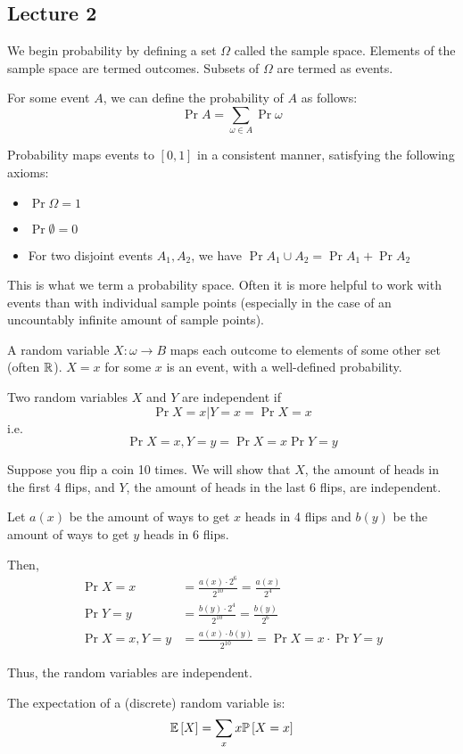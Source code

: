 \subsection{Lecture 2}

We begin probability by defining a set $\Omega$ called the sample space.
Elements of the sample space are termed outcomes. Subsets of $\Omega$ are termed as events.

For some event $A$, we can define the probability of $A$ as follows:
\[ \Pr{A} = \sum_{\omega \in A} \Pr{\omega} \]

Probability maps events to $[0, 1]$ in a consistent manner, satisfying the following axioms:
\begin{itemize}
    \item $\Pr{\Omega} = 1$
    \item $\Pr{\emptyset} = 0$
    \item For two disjoint events $A_1, A_2$, we have $\Pr{A_1 \cup A_2} = \Pr{A_1} + \Pr{A_2}$
\end{itemize}
This is what we term a probability space. Often it is more helpful to work with events than
with individual sample points (especially in the case of an uncountably infinite amount of sample points).

\begin{definition} 
    A random variable $X: \omega \to B$ maps each outcome to elements of some other set (often $\operatorname{\mathbb{R}}$).
    $X = x$ for some $x$ is an event, with a well-defined probability.
\end{definition}


\begin{definition} [Independence]
    Two random variables $X$ and $Y$ are independent if
    \[\Pr{X = x | Y = x} = \Pr{X = x} \]
    i.e.
    \[\Pr{X = x, Y = y} = \Pr{X = x} \Pr{Y = y} \]
\end{definition}

\begin{example}
    Suppose you flip a coin 10 times.
    We will show that $X$, the amount of heads in the first 4 flips, and $Y$, the amount
    of heads in the last 6 flips, are independent.

    Let $a(x)$ be the amount of ways to get $x$ heads in 4 flips and $b(y)$ be the amount
    of ways to get $y$ heads in 6 flips.

    Then,
    \begin{align*}
        \Pr{X=x} &= \frac{a(x) \cdot 2^6}{2^{10}} = \frac{a(x)}{2^4} \\
        \Pr{Y=y} &= \frac{b(y) \cdot 2^4}{2^{10}} = \frac{b(y)}{2^6} \\
        \Pr{X=x, Y=y} &= \frac{a(x) \cdot b(y)}{2^{10}} = \Pr{X=x} \cdot \Pr{Y=y} 
    \end{align*}

    Thus, the random variables are independent.
\end{example}
\begin{definition} [Expectation]
    The expectation of a (discrete) random variable is:
    \[ \mathbb{E}\left[ X \right] = \sum_{x} x \mathbb{P}\left[ X = x \right] \]
\end{definition}

